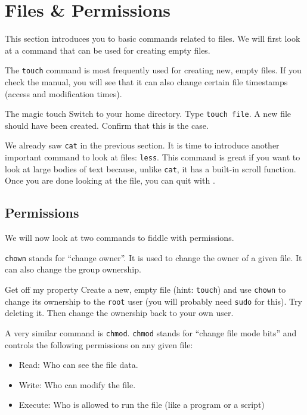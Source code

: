 \documentclass{TheAlternativeCourse}
\begin{document}
\section{Files \& Permissions}

This section introduces you to basic commands related to files. We will first
look at a command that can be used for creating empty files.

The \texttt{touch} command is most frequently used for creating new, empty
files. If you check the manual, you will see that it can also change certain
file timestamps (access and modification times).

\begin{exercisebox}{The magic touch}
    Switch to your home directory. Type \texttt{touch file}. A new file should
    have been created. Confirm that this is the case.
\end{exercisebox}
%
We already saw \texttt{cat} in the previous section. It is time to introduce
another important command to look at files: \texttt{less}. This command is
great if you want to look at large bodies of text because, unlike \texttt{cat},
it has a built-in scroll function. Once you are done looking at the file, you
can quit with .

\subsection{Permissions}

We will now look at two commands to fiddle with permissions.

\texttt{chown} stands for ``change owner''. It is used to change the owner of a
given file. It can also change the group ownership.

\begin{exercisebox}{Get off my property}
    Create a new, empty file (hint: \texttt{touch}) and use \texttt{chown} to
    change its ownership to the \texttt{root} user (you will probably need
    \texttt{sudo} for this). Try deleting it. Then change the ownership back to
    your own user.
\end{exercisebox}
%
A very similar command is \texttt{chmod}. \texttt{chmod} stands for ``change
file mode bits'' and controls the following permissions on any given file:

\begin{itemize}
	\item Read: Who can see the file data.
	\item Write: Who can modify the file.
	\item Execute: Who is allowed to run the file (like a program or a script)
\end{itemize}
\end{document}
